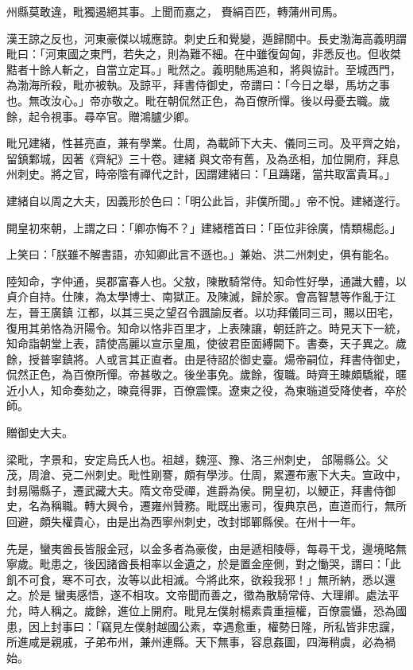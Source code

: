 \begin{pinyinscope}
 州縣莫敢違，毗獨遏絕其事。上聞而嘉之，
 賚絹百匹，轉蒲州司馬。



 漢王諒之反也，河東豪傑以城應諒。刺史丘和覺變，遁歸關中。長史渤海高義明謂毗曰：「河東國之東門，若失之，則為難不細。在中雖復匈匈，非悉反也。但收桀黠者十餘人斬之，自當立定耳。」毗然之。義明馳馬追和，將與協計。至城西門，為渤海所殺，毗亦被執。及諒平，拜書侍御史，帝謂曰：「今日之舉，馬坊之事也。無改汝心。」帝亦敬之。毗在朝侃然正色，為百僚所憚。後以母憂去職。歲餘，起令視事。尋卒官。贈鴻臚少卿。



 毗兄建緒，性甚亮直，兼有學業。仕周，為載師下大夫、儀同三司。及平齊之始，留鎮鄴城，因著《齊紀》三十卷。建緒
 與文帝有舊，及為丞相，加位開府，拜息州刺史。將之官，時帝陰有禪代之計，因謂建緒曰：「且躊躇，當共取富貴耳。」



 建緒自以周之大夫，因義形於色曰：「明公此旨，非僕所聞。」帝不悅。建緒遂行。



 開皇初來朝，上謂之曰：「卿亦悔不？」建緒稽首曰：「臣位非徐廣，情類楊彪。」



 上笑曰：「朕雖不解書語，亦知卿此言不遜也。」兼始、洪二州刺史，俱有能名。



 陸知命，字仲通，吳郡富春人也。父敖，陳散騎常侍。知命性好學，通識大體，以貞介自持。仕陳，為太學博士、南獄正。及陳滅，歸於家。會高智慧等作亂于江左，晉王廣鎮
 江都，以其三吳之望召令諷諭反者。以功拜儀同三司，賜以田宅，復用其弟恪為汧陽令。知命以恪非百里才，上表陳讓，朝廷許之。時見天下一統，知命詣朝堂上表，請使高麗以宣示皇風，使彼君臣面縛闕下。書奏，天子異之。歲餘，授普寧鎮將。人或言其正直者。由是待詔於御史臺。煬帝嗣位，拜書侍御史，侃然正色，為百僚所憚。帝甚敬之。後坐事免。歲餘，復職。時齊王暕頗驕縱，暱近小人，知命奏劾之，暕竟得罪，百僚震慄。遼東之役，為東暆道受降使者，卒於師。



 贈御史大夫。



 梁毗，字景和，安定烏氏人也。祖越，魏涇、豫、洛三州刺史，
 郃陽縣公。父茂，周滄、兗二州刺史。毗性剛謇，頗有學涉。仕周，累遷布憲下大夫。宣政中，封易陽縣子，遷武藏大夫。隋文帝受禪，進爵為侯。開皇初，以鯁正，拜書侍御史，名為稱職。轉大興令，遷雍州贊務。毗既出憲司，復典京邑，直道而行，無所回避，頗失權貴心，由是出為西寧州刺史，改封邯鄲縣侯。在州十一年。



 先是，蠻夷酋長皆服金冠，以金多者為豪俊，由是遞相陵辱，每尋干戈，邊境略無寧歲。毗患之，後因諸酋長相率以金遺之，於是置金座側，對之慟哭，謂曰：「此飢不可食，寒不可衣，汝等以此相滅。今將此來，欲殺我邪！」無所納，悉以還之。於是
 蠻夷感悟，遂不相攻。文帝聞而善之，徵為散騎常侍、大理卿。處法平允，時人稱之。歲餘，進位上開府。毗見左僕射楊素貴重擅權，百僚震懾，恐為國患，因上封事曰：「竊見左僕射越國公素，幸遇愈重，權勢日隆，所私皆非忠讜，所進咸是親戚，子弟布州，兼州連縣。天下無事，容息姦圖，四海稍虞，必為禍始。




\end{pinyinscope}
